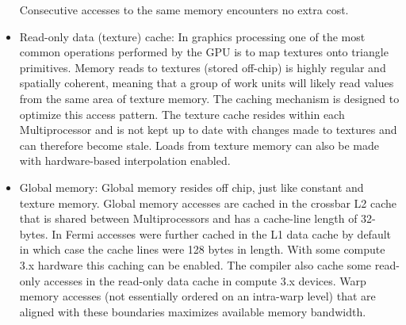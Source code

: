 \begin{itemize}
 Consecutive accesses to the same memory encounters no extra cost.
 \item Read-only data (texture) cache: In graphics processing one of the most common operations performed by the GPU is to map textures onto triangle primitives. 
 Memory reads to textures (stored off-chip) is highly regular and spatially coherent, meaning that a group of work units will likely read values from the same area of texture
 memory. The caching mechanism is designed to optimize this access pattern. The texture cache resides within each Multiprocessor and is not kept up to date with changes made to
 textures and can therefore become stale. Loads from texture memory can also be made with hardware-based interpolation enabled.
 \item Global memory: Global memory resides off chip, just like constant and texture memory. Global memory accesses
 are cached in the crossbar L2 cache that is shared between Multiprocessors and has a cache-line length of 32-bytes. In Fermi accesses were further cached in the L1
 data cache by default in which case the cache lines were 128 bytes in length. With some compute 3.x hardware this caching can be enabled. The compiler also cache 
 some read-only accesses in the read-only data cache in compute 3.x devices. Warp memory accesses (not essentially ordered on an intra-warp level) that are aligned 
 with these boundaries maximizes available memory bandwidth.
\end{itemize}
